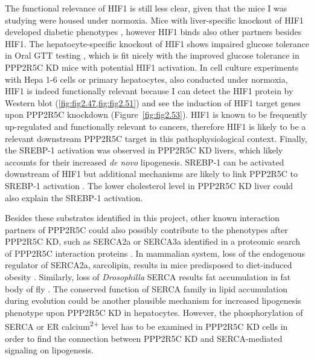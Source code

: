 The functional relevance of HIF1\textalpha{} is still less clear, given that the mice I was studying were housed under normoxia. Mice with liver-specific knockout of HIF1\textbeta{} developed diabetic phenotypes \cite{wang_ablation_2009}, however HIF1\textbeta{} binds also other partners besides HIF1\textalpha{}. The hepatocyte-specific knockout of HIF1\textalpha{} shows impaired glucose tolerance in Oral GTT testing \cite{ochiai_disruption_2011}, which is fit nicely with the improved glucose tolerance in PPP2R5C KD mice with potential HIF1\textalpha{} activation. In cell culture experiments with Hepa 1-6  cells or primary hepatocytes, also conducted under normoxia, HIF1\textalpha{} is indeed functionally relevant because I can detect the HIF1\textalpha{} protein by Western blot (\cref{fig:fig2.47,fig:fig2.51}) and see the induction of HIF1\textalpha{} target genes upon PPP2R5C knockdown (Figure~\ref{fig:fig2.53}). HIF1\textalpha{} is known to be frequently up-regulated and functionally relevant to cancers, therefore HIF1\textalpha{} is likely to be a relevant downstream PPP2R5C target in this pathophysiological context. Finally, the SREBP-1 activation was observed in PPP2R5C KD livers, which likely accounts for their increased \textit{de novo} lipogenesis. SREBP-1 can be activated downstream of HIF1\textalpha{} but additional mechanisms are likely to link PPP2R5C to SREBP-1 activation \cite{furuta_fatty_2008}. The lower cholesterol level in PPP2R5C KD liver could also explain the SREBP-1 activation. 

Besides these substrates identified in this project, other known interaction partners of PPP2R5C could also possibly contribute to the phenotypes after PPP2R5C KD, such as SERCA2a or SERCA3a identified in a proteomic search of PPP2R5C interaction proteins \cite{zhou_proteomic_2007}. In mammalian system, loss of the endogenous regulator of SERCA2a, sarcolipin, results in mice predisposed to diet-induced obesity \cite{bal_sarcolipin_2012}. Similarly, loss of \textit{Drosophilla} SERCA results fat accumulation in fat body of fly \cite{bi_seipin_2014}. The conserved function of SERCA family in lipid accumulation during evolution could be another plausible mechanism for increased lipogenesis phenotype upon PPP2R5C KD in hepatocytes. However, the phosphorylation of SERCA or ER calcium\textsuperscript{2+} level has to be examined in PPP2R5C KD cells in order to find the connection between PPP2R5C KD and SERCA-mediated signaling on lipogenesis.  




